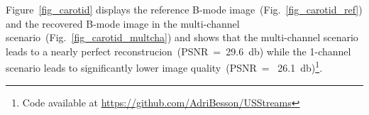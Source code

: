 \documentclass{article}
\theoremstyle{definition}
\begin{document}
Figure~\ref{fig_carotid} displays the reference B-mode image~(Fig.~\ref{fig_carotid_ref}) and the recovered B-mode image in the multi-channel scenario~(Fig.~\ref{fig_carotid_multcha}) and shows that the multi-channel scenario leads to a nearly perfect reconstrucion~(PSNR~=~\SI{29.6}{\decibel}) while the \num{1}-channel scenario leads to significantly lower image quality~(PSNR~=~ \SI{26.1}{\decibel})\footnote{Code available at \url{https://github.com/AdriBesson/USStreams}}.
\setlength{\CohSubFigWidth}{0.24\textwidth}
\end{document}

